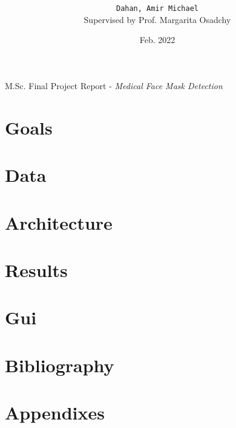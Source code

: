 

\title{ }

\author{
  \texttt{Dahan, Amir Michael}\\
  Supervised by Prof. Margarita Osadchy
}
\date{Feb. 2022}



\maketitle

M.Sc. Final Project Report - \emph{Medical Face Mask Detection}

    \clearpage
    \tableofcontents
    \clearpage

    \section{Goals}\label{sec:goals}
    

    \section{Data}\label{sec:Data}
    

    \section{Architecture}\label{sec:architecture}
    

    \section{Results}\label{sec:results}
    

    \section{Gui}\label{sec:gui}
    

    \section{Bibliography}\label{sec:bibliography}
    

    \section{Appendixes}\label{sec:appendixes}
    


